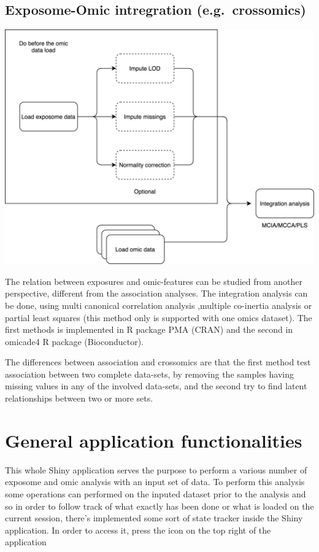 \documentclass[
]{book}
\begin{document}
\hypertarget{exposome-omic-intregration-e.g.-crossomics}{%
\section{Exposome-Omic intregration (e.g.~crossomics)}\label{exposome-omic-intregration-e.g.-crossomics}}

\includegraphics{images/analysis12.png}

The relation between exposures and omic-features can be studied from another perspective, different from the association analyses. The integration analysis can be done, using multi canonical correlation analysis ,multiple co-inertia analysis or partial least squares (this method only is supported with one omics dataset). The first methods is implemented in R package PMA (CRAN) and the second in omicade4 R package (Bioconductor).

The differences between association and crossomics are that the first method test association between two complete data-sets, by removing the samples having missing values in any of the involved data-sets, and the second try to find latent relationships between two or more sets.

\hypertarget{general-application-functionalities}{%
\chapter{General application functionalities}\label{general-application-functionalities}}

This whole Shiny application serves the purpose to perform a various number of exposome and omic analysis with an input set of data. To perform this analysis some operations can performed on the inputed dataset prior to the analysis and so in order to follow track of what exactly has been done or what is loaded on the current session, there's implemented some sort of state tracker inside the Shiny application. In order to access it, press the icon on the top right of the application
\end{document}
